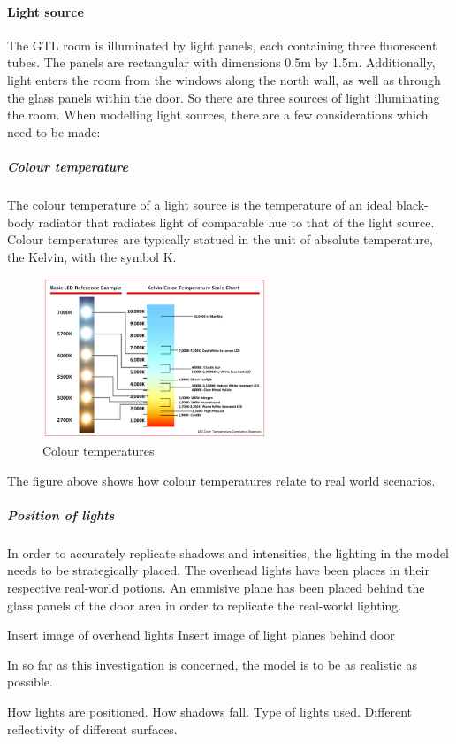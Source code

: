 \documentclass[11pt,a4paper]{report}
\begin{document}
				\paragraph{Light source}
					The GTL room is illuminated by light panels, each containing three fluorescent tubes. The panels are rectangular with dimensions 0.5m by 1.5m. Additionally, light enters the room from the windows along the north wall, as well as through the glass panels within the door. So there are three sources of light illuminating the room. When modelling light sources, there are a few considerations which need to be made:
					\subparagraph{Colour temperature}
						The colour temperature of a light source is the temperature of an ideal black-body radiator that radiates light of comparable hue to that of the light source. Colour temperatures are typically statued in the unit of absolute temperature, the Kelvin, with the symbol K.
						\begin{figure}[h!]
							\centering
							\includegraphics[width=0.6\textwidth]{colour_temperature}
							\caption{Colour temperatures}
						\end{figure}
						The figure above shows how colour temperatures relate to real world scenarios.
				
					\subparagraph{Position of lights}
						In order to accurately replicate shadows and intensities, the lighting in the model needs to be strategically placed. The overhead lights have been places in their respective real-world potions. An emmisive plane has been placed behind the glass panels of the door area in order to replicate the real-world lighting.
						
						{{Insert image of overhead lights}}
						{{Insert image of light planes behind door}}
				
				In so far as this investigation is concerned, the model is to be as realistic as possible. 
			
				How lights are positioned. How shadows fall.
				Type of lights used.
				Different reflectivity of different surfaces.
			
\end{document}
